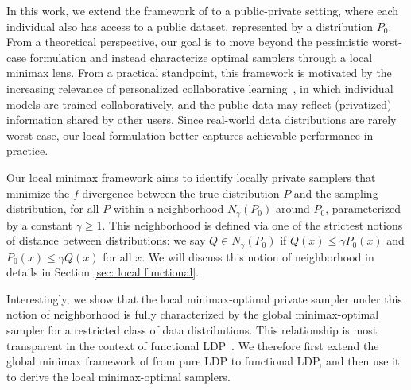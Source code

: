 \documentclass[accepted]{article}
\theoremstyle{plain} %
\theoremstyle{definition}
\theoremstyle{remark}
\begin{document}
In this work, we extend the framework of \citet{park2024exactly} to a public-private setting, where each individual also has access to a public dataset, represented by a distribution $P_0$. From a theoretical perspective, our goal is to move beyond the pessimistic worst-case formulation and instead characterize optimal samplers through a local minimax lens. From a practical standpoint, this framework is motivated by the increasing relevance of personalized collaborative learning~\citep{ozkara2023a,Beirami_personalization,Personalization3}, in which individual models are trained collaboratively, and the public data may reflect (privatized) information shared by other users. Since real-world data distributions are rarely worst-case, our local formulation better captures achievable performance in practice.

Our local minimax framework aims to identify locally private samplers that minimize the $f$-divergence between the true distribution $P$ and the sampling distribution, for all $P$ within a neighborhood $N_\gamma(P_0)$ around $P_0$, parameterized by a constant $\gamma \geq  1$. This neighborhood is defined via one of the strictest notions of distance between distributions: we say $Q \in N_\gamma(P_0)$ if $Q(x) \leq \gamma P_0(x)$ and $P_0(x) \leq \gamma Q(x)$ for all $x$. We will discuss this notion of neighborhood in details in Section \ref{sec: local functional}. 

Interestingly, we show that the local minimax-optimal private sampler under this notion of neighborhood is fully characterized by the global minimax-optimal sampler for a restricted class of data distributions. This relationship is most transparent in the context of functional LDP~\citep{dong2022gaussian}. We therefore first extend the global minimax framework of \citet{park2024exactly} from pure LDP to functional LDP, and then use it to derive the local minimax-optimal samplers. 
\end{document}
